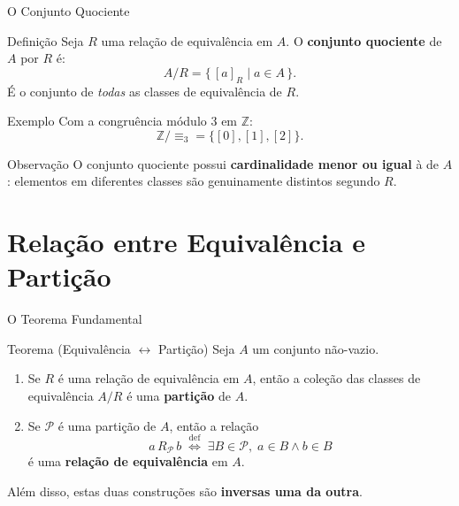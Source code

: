 \documentclass[9pt]{beamer}
\begin{document}
\begin{frame}{O Conjunto Quociente}

\begin{block}{Definição}
Seja $R$ uma relação de equivalência em $A$. O \textbf{conjunto quociente} de $A$ por $R$ é:
\[
A/R = \{\,[a]_R \mid a \in A\,\}.
\]
É o conjunto de \emph{todas} as classes de equivalência de $R$.
\end{block}

\begin{block}{Exemplo}
Com a congruência módulo $3$ em $\mathbb{Z}$:
\[
\mathbb{Z}/{\equiv_3} = \{[0],[1],[2]\}.
\]
\end{block}

\begin{block}{Observação}
O conjunto quociente possui \textbf{cardinalidade menor ou igual} à de $A$:
elementos em diferentes classes são genuinamente distintos segundo $R$.
\end{block}

\end{frame}

\section{Relação entre Equivalência e Partição}

\begin{frame}{O Teorema Fundamental}

\begin{block}{Teorema (Equivalência $\leftrightarrow$ Partição)}
Seja $A$ um conjunto não-vazio.
\begin{enumerate}
  \item Se $R$ é uma relação de equivalência em $A$, então a coleção das classes de equivalência $A/R$ é uma \textbf{partição} de $A$.
  \item Se $\mathcal{P}$ é uma partição de $A$, então a relação
  \[
    a\,R_{\mathcal{P}}\,b \;\stackrel{\text{def}}{\Longleftrightarrow}\; \exists B \in \mathcal{P},\; a \in B \land b \in B
  \]
  é uma \textbf{relação de equivalência} em $A$.
\end{enumerate}
Além disso, estas duas construções são \textbf{inversas uma da outra}.
\end{block}

\end{frame}
\end{document}
